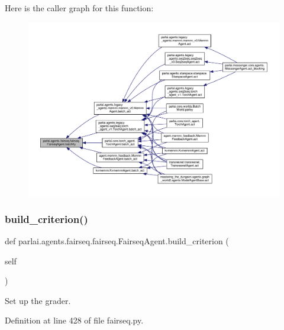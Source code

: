 Here is the caller graph for this function\+:
\nopagebreak
\begin{figure}[H]
\begin{center}
\leavevmode
\includegraphics[width=350pt]{classparlai_1_1agents_1_1fairseq_1_1fairseq_1_1FairseqAgent_ae5dc403e172c9cb8ecd48525175af56d_icgraph}
\end{center}
\end{figure}
\mbox{\label{classparlai_1_1agents_1_1fairseq_1_1fairseq_1_1FairseqAgent_a1ec171aaa11cc89157238d60da9661a0}} 
\subsubsection{\texorpdfstring{build\+\_\+criterion()}{build\_criterion()}}
{\footnotesize\ttfamily def parlai.\+agents.\+fairseq.\+fairseq.\+Fairseq\+Agent.\+build\+\_\+criterion (\begin{DoxyParamCaption}\item[{}]{self }\end{DoxyParamCaption})}

\begin{DoxyVerb}Set up the grader.\end{DoxyVerb}
 

Definition at line 428 of file fairseq.\+py.




